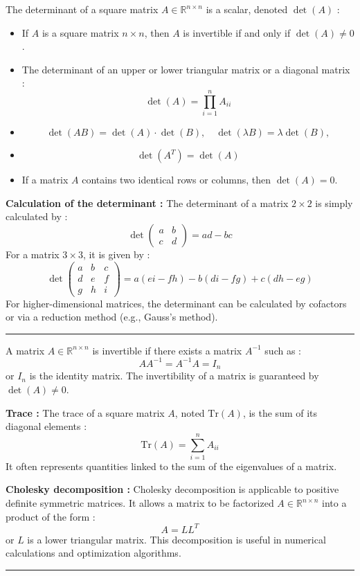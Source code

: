 \begin{f}
  
The determinant of a square matrix \( A \in \mathbb{R}^{n \times n} \) is a scalar, denoted \( \det(A) \) :
\begin{itemize}
    \item If \( A \) is a square matrix \( n \times n \), then \( A \) is invertible if and only if \( \det(A) \neq 0 \).
    \item The determinant of an upper or lower triangular matrix or a diagonal matrix :
    \[
    \det(A) = \prod_{i=1}^{n} A_{ii}
    \]
    \item
    \[
    \det(AB) = \det(A) \cdot \det(B),\quad \det(\lambda B) = \lambda\det(B), 
    \]
    \item 
    \[
    \det(A^T) = \det(A)
    \]
    \item If a matrix \( A \) contains two identical rows or columns, then \( \det(A) = 0 \).
\end{itemize}

\textbf{Calculation of the determinant :}
The determinant of a matrix \( 2 \times 2 \) is simply calculated by :
\[
\det\begin{pmatrix} a & b \\ c & d \end{pmatrix} = ad - bc
\]
For a matrix \( 3 \times 3 \), it is given by :
\[
\det\begin{pmatrix} a & b & c \\ d & e & f \\ g & h & i \end{pmatrix} = a(ei - fh) - b(di - fg) + c(dh - eg)
\]
For higher-dimensional matrices, the determinant can be calculated by cofactors or via a reduction method (e.g., Gauss's method).

\end{f}
\hrule
\begin{f} 
A matrix \( A \in \mathbb{R}^{n \times n} \) is invertible if there exists a matrix \( A^{-1} \) such as :
\[
A A^{-1} = A^{-1} A = I_n
\]
or \( I_n \) is the identity matrix. The invertibility of a matrix is guaranteed by \( \det(A) \neq 0 \).

\textbf{Trace :}
The trace of a square matrix \( A \), noted \( \text{Tr}(A) \), is the sum of its diagonal elements :
\[
\text{Tr}(A) = \sum_{i=1}^{n} A_{ii}
\]
It often represents quantities linked to the sum of the eigenvalues of a matrix.

\textbf{Cholesky decomposition :}
Cholesky decomposition is applicable to positive definite symmetric matrices. It allows a matrix to be factorized \( A \in \mathbb{R}^{n \times n} \) into a product of the form :
\[
A = LL^T
\]
or \( L \) is a lower triangular matrix. This decomposition is useful in numerical calculations and optimization algorithms.

\end{f}
\hrule

